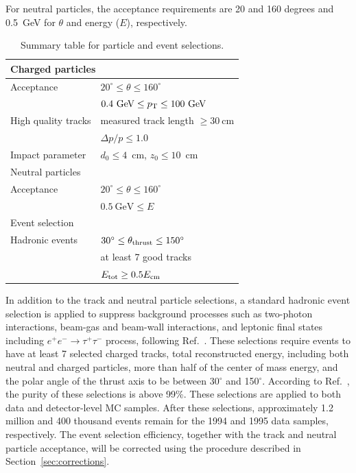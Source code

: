 \documentclass[a4paper,11pt]{article}
\begin{document}
For neutral particles, the acceptance requirements are 20 and 160 degrees and 0.5~GeV for $\theta$ and energy ($E$), respectively. 
\begin{table}[ht]
\centering
\begin{tabularx}{\textwidth}{l|l}
\hline\hline
\multicolumn{2}{l}{Charged particles}  \\
\hline
Acceptance              & $20^\circ\le\theta\le160^\circ$ \\
                        & $0.4~\text{GeV} \le p_{\rm T} \le 100~\text{GeV}$ \\
High quality tracks     & measured track length $\ge 30~\text{cm}$ \\
                        & $\Delta p/p \le1.0 $ \\
Impact parameter        & $d_0\le4$~cm, $z_0\le10$~cm \\
\hline\hline
\multicolumn{2}{l}{Neutral particles}  \\
\hline
Acceptance              & $20^\circ\le\theta\le160^\circ$ \\
                        & $0.5~\text{GeV} \le E $ \\
\hline\hline
\multicolumn{2}{l}{Event selection}  \\
\hline
Hadronic events         & $30^\circ \le \theta_{\rm thrust} \le 150^\circ$\\
                        & at least 7 good tracks \\
                        & $E_{\rm tot} \ge 0.5E_{\rm cm}$ \\
\hline\hline
\end{tabularx} 
\caption{Summary table for particle and event selections.}
\label{tab:SelectionSummary}
\end{table}

In addition to the track and neutral particle selections, a standard hadronic event selection is applied to suppress background processes such as two-photon interactions, beam-gas and beam-wall interactions, and leptonic final states including $e^{+}e^{-}\to \tau^{+}\tau^{-}$ process, following Ref.~\cite{DELPHI:2003yqh}. 
These selections require events to have at least 7 selected charged tracks, total reconstructed energy, including both neutral and charged particles, more than half of the center of mass energy, and the polar angle of the thrust axis to be between 30$^\circ$ and 150$^\circ$. 
According to Ref.~\cite {DELPHI:2003yqh}, the purity of these selections is above 99\%. 
These selections are applied to both data and detector-level MC samples.
After these selections, approximately 1.2 million and 400 thousand events remain for the 1994 and 1995 data samples, respectively.
The event selection efficiency, together with the track and neutral particle acceptance, will be corrected using the procedure described in Section~\ref{sec:corrections}.
\end{document}
